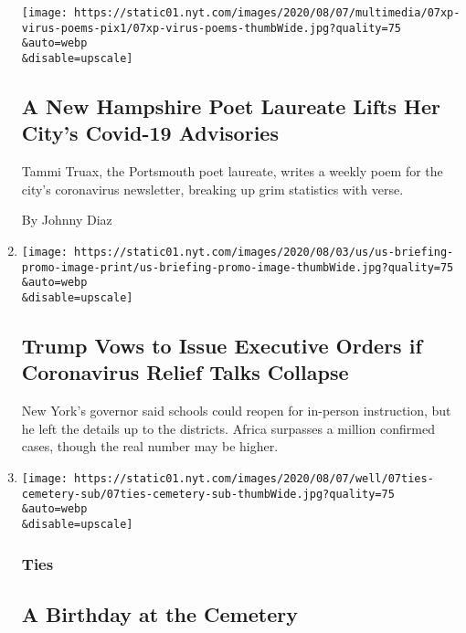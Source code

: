 \begin{enumerate}
  \texttt{[image: https://static01.nyt.com/images/2020/08/07/multimedia/07xp-virus-poems-pix1/07xp-virus-poems-thumbWide.jpg?quality=75\\\&auto=webp\\\&disable=upscale]}

  \hypertarget{a-new-hampshire-poet-laureate-lifts-her-citys-covid-19-advisories}{%
  \subsection{A New Hampshire Poet Laureate Lifts Her City's Covid-19
  Advisories}\label{a-new-hampshire-poet-laureate-lifts-her-citys-covid-19-advisories}}

  Tammi Truax, the Portsmouth poet laureate, writes a weekly poem for
  the city's coronavirus newsletter, breaking up grim statistics with
  verse.

  By Johnny Diaz
\item
  \href{/2020/08/07/world/covid-19-news.html}{}

  \texttt{[image: https://static01.nyt.com/images/2020/08/03/us/us-briefing-promo-image-print/us-briefing-promo-image-thumbWide.jpg?quality=75\\\&auto=webp\\\&disable=upscale]}

  \hypertarget{trump-vows-to-issue-executive-orders-if-coronavirus-relief-talks-collapse}{%
  \subsection{Trump Vows to Issue Executive Orders if Coronavirus Relief
  Talks
  Collapse}\label{trump-vows-to-issue-executive-orders-if-coronavirus-relief-talks-collapse}}

  New York's governor said schools could reopen for in-person
  instruction, but he left the details up to the districts. Africa
  surpasses a million confirmed cases, though the real number may be
  higher.
\item
  \href{/2020/08/07/well/family/a-birthday-at-the-cemetery.html}{}

  \texttt{[image: https://static01.nyt.com/images/2020/08/07/well/07ties-cemetery-sub/07ties-cemetery-sub-thumbWide.jpg?quality=75\\\&auto=webp\\\&disable=upscale]}

  \hypertarget{ties}{%
  \subsubsection{Ties}\label{ties}}

  \hypertarget{a-birthday-at-the-cemetery}{%
  \subsection{A Birthday at the
  Cemetery}\label{a-birthday-at-the-cemetery}}


\end{enumerate}
